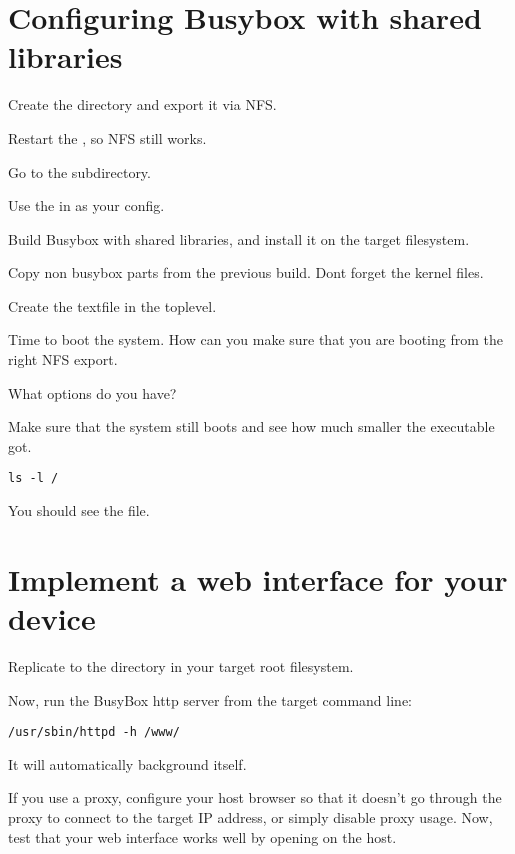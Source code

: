 \section{Configuring Busybox with shared libraries}

Create the  directory and export it via NFS.

Restart the , so NFS still works.

Go to the  subdirectory.

Use the  in  as your config.

Build Busybox with shared libraries, and install it on the target filesystem. 

Copy non busybox parts from the previous build. Dont forget the kernel files.

Create the  textfile in the toplevel.

Time to boot the system. How can you make sure that 
you are booting from the right NFS export.

What options do you have?

Make sure that the system still boots and see
how much smaller the  executable got.


\begin{verbatim}
ls -l /
\end{verbatim}

You should see the  file.

\section{Implement a web interface for your device}

Replicate  to the  directory in your target root filesystem.

Now, run the BusyBox http server from the target command line:

\begin{verbatim}
/usr/sbin/httpd -h /www/
\end{verbatim}

It will automatically background itself.

If you use a proxy, configure your host browser so that it doesn't go
through the proxy to connect to the target IP address, or simply
disable proxy usage.  Now, test that your web interface works well by
opening  on the host.

